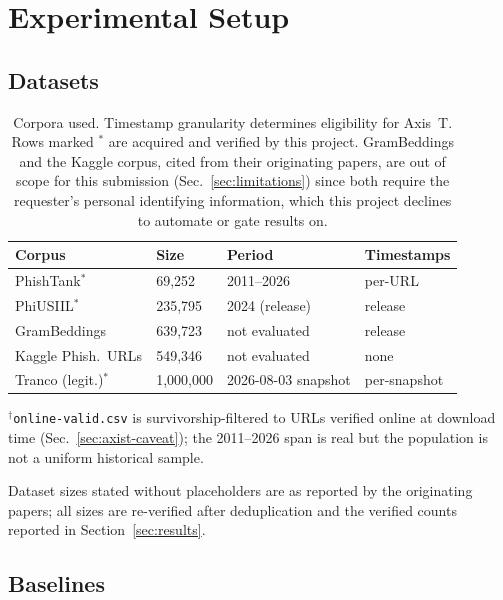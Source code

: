 \documentclass[conference]{IEEEtran}
\begin{document}
\section{Experimental Setup}

\subsection{Datasets}
\label{sec:datasets}

\begin{table}[t]
\caption{Corpora used. Timestamp granularity determines eligibility for
Axis~T. Rows marked $^*$ are acquired and verified by this project.
GramBeddings and the Kaggle corpus, cited from their originating papers,
are out of scope for this submission (Sec.~\ref{sec:limitations}) since
both require the requester's personal identifying information, which
this project declines to automate or gate results on.}
\label{tab:datasets}
\centering\scriptsize
\setlength{\tabcolsep}{3pt}
\begin{tabular}{@{}llll@{}}
\toprule
\textbf{Corpus} & \textbf{Size} & \textbf{Period} & \textbf{Timestamps}\\
\midrule
PhishTank$^*$       & 69{,}252      & 2011--2026\rlap{$^\dagger$} & per-URL\\
PhiUSIIL$^*$        & 235{,}795     & 2024 (release) & release\\
GramBeddings        & 639{,}723     & not evaluated & release\\
Kaggle Phish.\ URLs & 549{,}346     & not evaluated & none\\
Tranco (legit.)$^*$ & 1{,}000{,}000 & 2026-08-03 snapshot & per-snapshot\\
\bottomrule
\end{tabular}
\vspace{2pt}
\raggedright\scriptsize
$^\dagger$\texttt{online-valid.csv} is survivorship-filtered to URLs verified
online at download time (Sec.~\ref{sec:axist-caveat}); the 2011--2026 span
is real but the population is not a uniform historical sample.
\end{table}

Dataset sizes stated without placeholders are as reported by the originating
papers; all sizes are re-verified after deduplication and the verified counts
reported in Section~\ref{sec:results}.

\subsection{Baselines}
\end{document}
